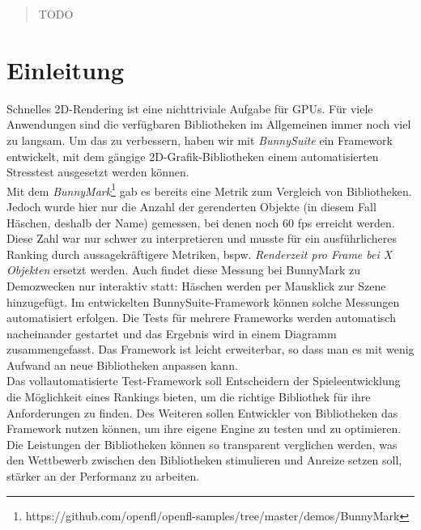 \begin{abstract}
TODO
\end{abstract}

\chapter{Einleitung}
Schnelles 2D-Rendering ist eine nichttriviale Aufgabe für GPUs. Für viele Anwendungen sind die verfügbaren Bibliotheken im Allgemeinen immer noch viel zu langsam. Um das zu verbessern, haben wir mit \textit{BunnySuite} ein Framework entwickelt, mit dem gängige 2D-Grafik-Bibliotheken einem automatisierten Stresstest ausgesetzt werden können.\\
Mit dem \textit{BunnyMark}\footnote{https://github.com/openfl/openfl-samples/tree/master/demos/BunnyMark} gab es bereits eine Metrik zum Vergleich von Bibliotheken. Jedoch wurde hier nur die Anzahl der gerenderten Objekte (in diesem Fall Häschen, deshalb der Name) gemessen, bei denen noch 60 fps erreicht werden. Diese Zahl war nur schwer zu interpretieren und musste für ein ausführlicheres Ranking durch aussagekräftigere Metriken, bspw. \textit{Renderzeit pro Frame bei X Objekten} ersetzt werden. Auch findet diese Messung bei BunnyMark zu Demozwecken nur interaktiv statt: Häschen werden per Mausklick zur Szene hinzugefügt. Im entwickelten BunnySuite-Framework können solche Messungen automatisiert erfolgen. Die Tests für mehrere Frameworks werden automatisch nacheinander gestartet und das Ergebnis wird in einem Diagramm zusammengefasst. Das Framework ist leicht erweiterbar, so dass man es mit wenig Aufwand an neue Bibliotheken anpassen kann.\\
Das vollautomatisierte Test-Framework soll Entscheidern der Spieleentwicklung die Möglichkeit eines Rankings bieten, um die richtige Bibliothek für ihre Anforderungen zu finden. Des Weiteren sollen Entwickler von Bibliotheken das Framework nutzen können, um ihre eigene Engine zu testen und zu optimieren. Die Leistungen der Bibliotheken können so transparent verglichen werden, was den Wettbewerb zwischen den Bibliotheken stimulieren und Anreize setzen soll, stärker an der Performanz zu arbeiten. 

